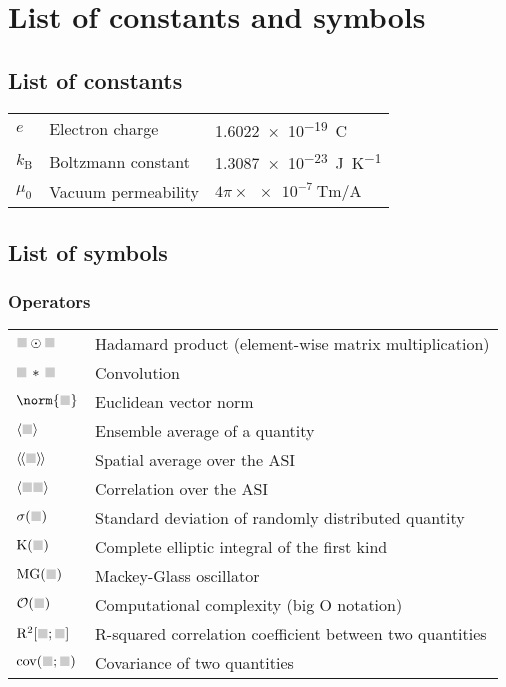 \chapter{List of constants and symbols}
\newlength\whiteline
\setlength\whiteline{15pt}

\section*{List of constants}
\begin{longtable}[l]{p{60pt} p{140pt} p{200pt}}
	$e$ & Electron charge & \SI{1.6022e-19}{\coulomb} \\
	$k_\mathrm{B}$ & Boltzmann constant & \SI{1.3087e-23}{\joule\per\kelvin} \\
	$\mu_0$ & Vacuum permeability & $4 \pi \times \SI{e-7}{\tesla\metre\per\ampere}$ \\[\whiteline]
\end{longtable}

\section*{List of symbols}
\subsection*{Operators}
\begin{longtable}[l]{p{60pt} p{350pt}}
	$\greybox \odot \greybox$ & Hadamard product (element-wise matrix multiplication) \\
	$\greybox \hspace{0.15em} * \hspace{0.15em} \greybox$ & Convolution \\
	$\norm{ \greybox }$ & Euclidean vector norm \\
	$\langle \greybox \rangle$ & Ensemble average of a quantity \\
	$\llangle \greybox \rrangle$ & Spatial average over the ASI \\
	$\langle \greybox \greybox \rangle$ & Correlation over the ASI \\
	$\sigma( \greybox )$ & Standard deviation of randomly distributed quantity \\
	$\mathrm{K}(\greybox)$ & Complete elliptic integral of the first kind \\
	$\mathrm{MG}(\greybox)$ & Mackey-Glass oscillator \\
	$\mathcal{O}(\greybox)$ & Computational complexity (big O notation) \\
	$\mathrm{R}^2[\greybox;\greybox]$ & R-squared correlation coefficient between two quantities \\
	$\mathrm{cov}(\greybox;\greybox)$ & Covariance of two quantities \\[\whiteline]
\end{longtable}

